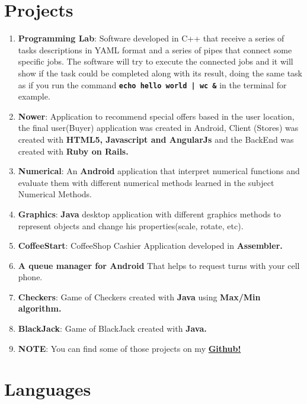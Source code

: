 \documentclass[a4paper,10pt]{article} %
\begin{document}
\section{Projects}
\begin{enumerate}
\item \textbf{Programming Lab}: Software developed in C++ that receive a series of tasks descriptions in YAML format and a series of pipes that connect some specific jobs. The software will try to execute the connected jobs and it will show if the task could be completed along with its result, doing the same task as if you run the command \textbf{\texttt{echo hello world | wc \&}} in the terminal for example.
\item \textbf{Nower}: Application to recommend special offers based in the user location, the final user(Buyer) application was created in Android, Client (Stores) was created with \textbf{HTML5, Javascript and AngularJs} and the BackEnd was created with \textbf{Ruby on Rails.}
\item \textbf{Numerical}: An \textbf{Android} application that interpret numerical functions and evaluate them with different numerical methods learned in the subject Numerical Methods.
\item \textbf{Graphics}: \textbf{Java} desktop application with different graphics methods to represent objects and change his properties(scale, rotate, etc).
\item \textbf{CoffeeStart}: CoffeeShop Cashier Application developed in \textbf{Assembler.}
\item \textbf{A queue manager for Android} That helps to request turns with your cell phone.
\item \textbf{Checkers}:  Game of Checkers created with \textbf{Java} using \textbf{Max/Min algorithm.}
\item \textbf{BlackJack}: Game of BlackJack created with \textbf{Java.}
\item \textbf{NOTE}: You can find some of those projects on my \href{https://github.com/EstebanFS}{\textbf{Github!}}
\end{enumerate}



\section{Languages}
\end{document}
